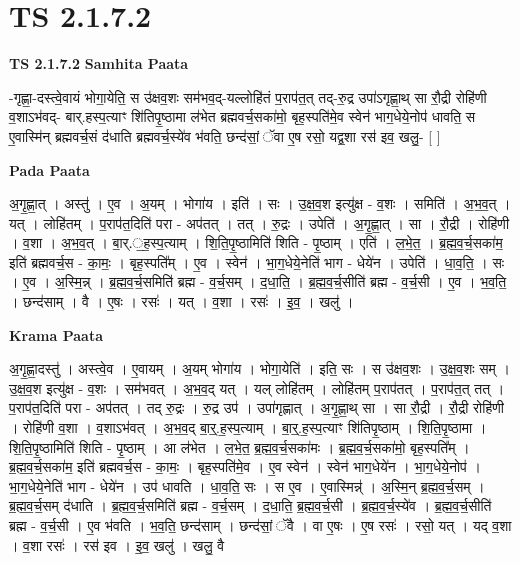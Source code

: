 \documentclass[17pt]{extarticle}
\begin{document}
\section*{ TS 2.1.7.2 }

\textbf{TS 2.1.7.2 } \newline
\textbf{Samhita Paata} \newline

-गृह्णा॒-दस्त्वे॒वायं भोगा॒येति॒ स उ॑क्षव॒शः सम॑भव॒द्-यल्लोहि॑तं प॒राप॑त॒त् तद्-रु॒द्र उपा॑ऽगृह्णा॒थ् सा रौ॒द्री रोहि॑णी व॒शाऽभ॑वद्- बार्.हस्प॒त्याꣳ शि॑तिपृ॒ष्ठामा ल॑भेत ब्रह्मवर्च॒सका॑मो॒ बृह॒स्पति॑मे॒व स्वेन॑ भाग॒धेये॒नोप॑ धावति॒ स ए॒वास्मि॑न् ब्रह्मवर्च॒सं द॑धाति ब्रह्मवर्च॒स्ये॑व भ॑वति॒ छन्द॑सां॒ ॅवा ए॒ष रसो॒ यद्व॒शा रस॑ इव॒ खलु॒- [  ] \newline

\textbf{Pada Paata} \newline

अ॒गृ॒ह्णा॒त् । अस्तु॑ । ए॒व । अ॒यम् । भोगा॑य । इति॑ । सः । उ॒क्ष॒व॒श इत्यु॑क्ष - व॒शः । समिति॑ । अ॒भ॒व॒त् । यत् । लोहि॑तम् । प॒राप॑त॒दिति॑ परा - अप॑तत् । तत् । रु॒द्रः । उपेति॑ । अ॒गृ॒ह्णा॒त् । सा । रौ॒द्री । रोहि॑णी । व॒शा । अ॒भ॒व॒त् । बा॒र्.॒ह॒स्प॒त्याम् । शि॒ति॒पृ॒ष्ठामिति॑ शिति - पृ॒ष्ठाम् । एति॑ । ल॒भे॒त॒ । ब्र॒ह्म॒व॒र्च॒सका॑म॒ इति॑ ब्रह्मवर्च॒स - का॒मः॒ । बृह॒स्पति᳚म् । ए॒व । स्वेन॑ । भा॒ग॒धेये॒नेति॑ भाग - धेये॑न । उपेति॑ । धा॒व॒ति॒ । सः । ए॒व । अ॒स्मि॒न्न् । ब्र॒ह्म॒व॒र्च॒समिति॑ ब्रह्म - व॒र्च॒सम् । द॒धा॒ति॒ । ब्र॒ह्म॒व॒र्च॒सीति॑ ब्रह्म - व॒र्च॒सी । ए॒व । भ॒व॒ति॒ । छन्द॑साम् । वै । ए॒षः । रसः॑ । यत् । व॒शा । रसः॑ । इ॒व॒ । खलु॑ ।  \newline


\textbf{Krama Paata} \newline

अ॒गृ॒ह्णा॒दस्तु॑ । अस्त्वे॒व । ए॒वायम् । अ॒यम् भोगा॑य । भोगा॒येति॑ । इति॒ सः । स उ॑क्षव॒शः । उ॒क्ष॒व॒शः सम् । उ॒क्ष॒व॒श इत्यु॑क्ष - व॒शः । सम॑भवत् । अ॒भ॒व॒द् यत् । यल् लोहि॑तम् । लोहि॑तम् प॒राप॑तत् । प॒राप॑त॒त् तत् । प॒राप॑त॒दिति॑ परा - अप॑तत् । तद् रु॒द्रः । रु॒द्र उप॑ । उपा॑गृह्णात् । अ॒गृ॒ह्णा॒थ् सा । सा रौ॒द्री । रौ॒द्री रोहि॑णी । रोहि॑णी व॒शा । व॒शाऽभ॑वत् । अ॒भ॒व॒द् बा॒र्॒.ह॒स्प॒त्याम् । बा॒र्॒.ह॒स्प॒त्याꣳ शि॑तिपृ॒ष्ठाम् । शि॒ति॒पृ॒ष्ठामा । शि॒ति॒पृ॒ष्ठामिति॑ शिति - पृ॒ष्ठाम् । आ ल॑भेत । ल॒भे॒त॒ ब्र॒ह्म॒व॒र्च॒सका॑मः । ब्र॒ह्म॒व॒र्च॒सका॑मो॒ बृह॒स्पति᳚म् । ब्र॒ह्म॒व॒र्च॒सका॑म॒ इति॑ ब्रह्मवर्च॒स - का॒मः॒ । बृह॒स्पति॑मे॒व । ए॒व स्वेन॑ । स्वेन॑ भाग॒धेये॑न । भा॒ग॒धेये॒नोप॑ । भा॒ग॒धेये॒नेति॑ भाग - धेये॑न । उप॑ धावति । धा॒व॒ति॒ सः । स ए॒व । ए॒वास्मिन्न्॑ । अ॒स्मि॒न् ब्र॒ह्म॒व॒र्च॒सम् । ब्र॒ह्म॒व॒र्च॒सम् द॑धाति । ब्र॒ह्म॒व॒र्च॒समिति॑ ब्रह्म - व॒र्च॒सम् । द॒धा॒ति॒ ब्र॒ह्म॒व॒र्च॒सी । ब्र॒ह्म॒व॒र्च॒स्ये॑व । ब्र॒ह्म॒व॒र्च॒सीति॑ ब्रह्म - व॒र्च॒सी । ए॒व भ॑वति । भ॒व॒ति॒ छन्द॑साम् । छन्द॑सां॒ ॅवै । वा ए॒षः । ए॒ष रसः॑ । रसो॒ यत् । यद् व॒शा । व॒शा रसः॑ । रस॑ इव । इ॒व॒ खलु॑ । खलु॒ वै \newline
\end{document}

